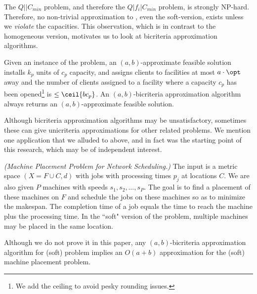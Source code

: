 The $Q||C_{min}$ problem, and therefore the $Q|f_i|C_{min}$ problem,  is strongly NP-hard. Therefore, no non-trivial approximation to \mckc, even the soft-version, exists unless we {\em violate} the capacities.
This observation, which is in contrast to the homogeneous version, motivates us to look at bicriteria approximation algorithms.
%
%
%
%
%
\begin{definition}
	Given an instance of the \mckc problem, an $(a,b)$-approximate feasible solution installs $k_p$ units of $c_p$ capacity, and
	assigns clients to  facilities at most $a\cdot\opt$ away and the number of clients assigned to a facility where a capacity
	$c_p$ has been opened\footnote{We add the ceiling to avoid pesky rounding issues.} is $\leq \ceil{bc_p}$. An $(a,b)$-bicriteria approximation algorithm always returns an $(a,b)$-approximate feasible solution.
\end{definition}
Although bicriteria approximation algorithms may be unsatisfactory, sometimes these can give unicriteria approximations for other related problems.
We mention one application that  we alluded to above, and in fact was the starting point of this research,  which may be of independent interest.
\begin{definition}\emph{(Machine Placement Problem for Network Scheduling.)}\label{def:mpp}
	The input is a metric space $(X=F\cup C,d)$ with jobs with processing times $p_j$ at locations $C$. We are also given $P$ machines with speeds $s_1,s_2,\ldots,s_P$.
	The goal is to find a placement of these machines on $F$ and schedule the jobs on these machines so as to minimize the makespan. The completion time of a job equals the time to reach the machine plus the processing time. In the ``soft" version of the problem, multiple machines may be placed in the same location.
\end{definition}
Although we do not prove it in this paper, any $(a,b)$-bicriteria approximation algorithm for (soft) \mckc problem implies an $O(a+b)$ approximation for the (soft) machine placement problem.

